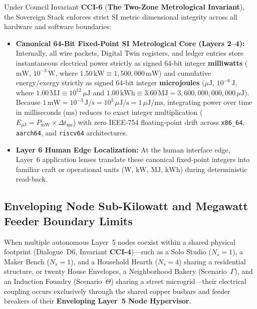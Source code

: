 Under Council Invariant \textbf{CCI-6} (\textbf{The Two-Zone Metrological Invariant}), the Sovereign Stack enforces strict SI metric dimensional integrity across all hardware and software boundaries:
\begin{itemize}
    \item \textbf{Canonical 64-Bit Fixed-Point SI Metrological Core (Layers 2--4):} Internally, all wire packets, Digital Twin registers, and ledger entries store instantaneous electrical power strictly as signed 64-bit integer \textbf{milliwatts} ($\mathrm{mW}$, $10^{-3}\,\mathrm{W}$, where $1.50\,\mathrm{kW} \equiv 1{,}500{,}000\,\mathrm{mW}$) and cumulative energy/exergy strictly as signed 64-bit integer \textbf{microjoules} ($\mu\mathrm{J}$, $10^{-6}\,\mathrm{J}$, where $1.00\,\mathrm{MJ} \equiv 10^{12}\,\mu\mathrm{J}$ and $1.00\,\mathrm{kWh} \equiv 3.60\,\mathrm{MJ} = 3{,}600{,}000{,}000{,}000\,\mu\mathrm{J}$). Because $1\,\mathrm{mW} = 10^{-3}\,\mathrm{J/s} = 10^{3}\,\mu\mathrm{J/s} = 1\,\mu\mathrm{J/ms}$, integrating power over time in milliseconds ($\mathrm{ms}$) reduces to exact integer multiplication ($E_{\mu\mathrm{J}} = P_{\mathrm{mW}} \times \Delta t_{\mathrm{ms}}$) with zero IEEE-754 floating-point drift across \texttt{x86\_64}, \texttt{aarch64}, and \texttt{riscv64} architectures.
    \item \textbf{Layer 6 Human Edge Localization:} At the human interface edge, Layer~6 application lenses translate these canonical fixed-point integers into familiar craft or operational units ($\mathrm{W}$, $\mathrm{kW}$, $\mathrm{MJ}$, $\mathrm{kWh}$) during deterministic read-back.
\end{itemize}

\subsection{Enveloping Node Sub-Kilowatt and Megawatt Feeder Boundary Limits}
\label{subsec:em_enveloping_feeder_limits}
When multiple autonomous Layer~5 nodes coexist within a shared physical footprint (Dialogue~D6, Invariant \textbf{CCI-4})---such as a Solo Studio ($N_s = 1$), a Maker Bench ($N_s = 1$), and a Household Hearth ($N_s = 4$) sharing a residential structure, or twenty House Envelopes, a Neighborhood Bakery (Scenario~$\Gamma$), and an Induction Foundry (Scenario~$\Theta$) sharing a street microgrid---their electrical coupling occurs exclusively through the shared copper busbars and feeder breakers of their \textbf{Enveloping Layer~5 Node Hypervisor}.

